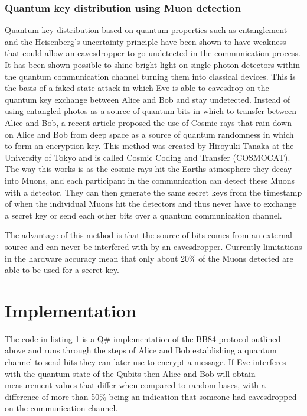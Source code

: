 \documentclass{article}
\begin{document}
\subsubsection{Quantum key distribution using Muon detection }
Quantum key distribution based on quantum properties such as entanglement and the Heisenberg's uncertainty principle have been shown to have weakness that could allow an eavesdropper to go undetected in the communication process. It has been shown possible to shine bright light on single-photon detectors within the quantum communication channel turning them into classical devices. This is the basis of a faked-state attack \cite{Guskind2009ControllingLight} in which Eve is able to eavesdrop on the quantum key exchange between Alice and Bob and stay undetected.
Instead of using entangled photos as a source of quantum bits in which to transfer between Alice and Bob, a recent article \cite{Cartlidge2023MuonsSystem} proposed the use of Cosmic rays that rain down on Alice and Bob from deep space as a source of quantum randomness in which to form an encryption key. This method was created by Hiroyuki Tanaka at the University of Tokyo and is called Cosmic Coding and Transfer (COSMOCAT). The way this works is as the cosmic rays hit the Earths atmosphere they decay into Muons, and each participant in the communication can detect these Muons with a detector. They can then generate the same secret keys from the timestamp of when the individual Muons hit the detectors and thus never have to exchange a secret key or send each other bits over a quantum communication channel. 

The advantage of this method is that the source of bits comes from an external source and can never be interfered with by an eavesdropper. Currently limitations in the hardware accuracy mean that only about 20\% of the Muons detected are able to be used for a secret key.


\section{Implementation}

The code \cite{Dale2023Leedale1981/msc-applied-crypto-coursework:Code.} in listing 1 is a Q\# implementation of the BB84 protocol outlined above and runs through the steps of Alice and Bob establishing a quantum channel to send bits they can later use to encrypt a message. If Eve interferes with the quantum state of the Qubits then Alice and Bob will obtain measurement values that differ when compared to random bases, with a difference of more than 50\% being an indication that someone had eavesdropped on the communication channel.
\end{document}
